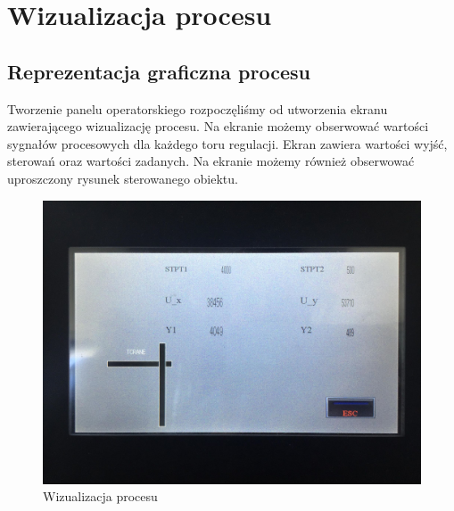 \chapter{Wizualizacja procesu}
\label{inteco_wizualizacja}

\section{Reprezentacja graficzna procesu}
\label{inteco_wizualizacja_repr}
Tworzenie panelu operatorskiego rozpoczęliśmy od utworzenia ekranu zawierającego wizualizację procesu. Na ekranie możemy obserwować wartości sygnałów procesowych dla każdego toru regulacji. Ekran zawiera wartości wyjść, sterowań oraz wartości zadanych. Na ekranie możemy również obserwować uproszczony rysunek sterowanego obiektu.
\\

\begin{figure}[H]
    \label{TCRANE::Wizualizacja}
    \centering
    \leftskip-1.1cm
    \includegraphics[scale=0.2]{./sections/inteco/images/reprezentacja_obiektu.jpg}
    \caption{Wizualizacja procesu}
\end{figure}
\newpage

